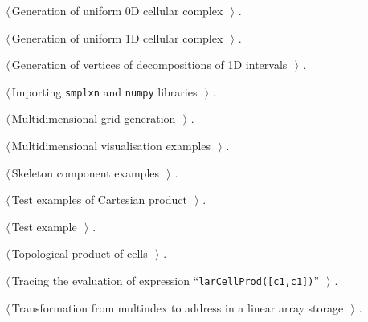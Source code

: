 \documentclass[11pt,oneside]{article}	%
\begin{document}
{\begin{list}{}{\setlength{\itemsep}{-\parsep}\setlength{\itemindent}{-\leftmargin}}
\item $\langle\,$Generation of uniform 0D cellular complex\nobreak\ {\footnotesize {}}$\,\rangle$ {\footnotesize {\NWtxtRefIn} .}
\item $\langle\,$Generation of uniform 1D cellular complex\nobreak\ {\footnotesize {}}$\,\rangle$ {\footnotesize {\NWtxtRefIn} .}
\item $\langle\,$Generation of vertices of decompositions of 1D intervals\nobreak\ {\footnotesize {}}$\,\rangle$ {\footnotesize {\NWtxtRefIn} .
}
\item $\langle\,$Importing \texttt{smplxn} and \texttt{numpy} libraries\nobreak\ {\footnotesize {}}$\,\rangle$ {\footnotesize {\NWtxtRefIn} .}
\item $\langle\,$Multidimensional grid generation\nobreak\ {\footnotesize {}}$\,\rangle$ {\footnotesize {\NWtxtRefIn} .}
\item $\langle\,$Multidimensional visualisation examples\nobreak\ {\footnotesize {}}$\,\rangle$ {\footnotesize {\NWtxtRefIn} .}
\item $\langle\,$Skeleton component examples\nobreak\ {\footnotesize {}}$\,\rangle$ {\footnotesize {\NWtxtNoRef}.}
\item $\langle\,$Test examples of Cartesian product\nobreak\ {\footnotesize {}}$\,\rangle$ {\footnotesize {\NWtxtRefIn} .}
\item $\langle\,$Test example\nobreak\ {\footnotesize {}}$\,\rangle$ {\footnotesize {\NWtxtNoRef}.}
\item $\langle\,$Topological product of cells\nobreak\ {\footnotesize {}}$\,\rangle$ {\footnotesize {\NWtxtRefIn} .}
\item $\langle\,$Tracing the evaluation of expression ``\texttt{larCellProd([c1,c1])}''\nobreak\ {\footnotesize {}}$\,\rangle$ {\footnotesize {\NWtxtNoRef}.}
\item $\langle\,$Transformation from multindex to address in a linear array storage\nobreak\ {\footnotesize {}}$\,\rangle$ {\footnotesize {\NWtxtRefIn} .}
\end{list}}
\end{document}
